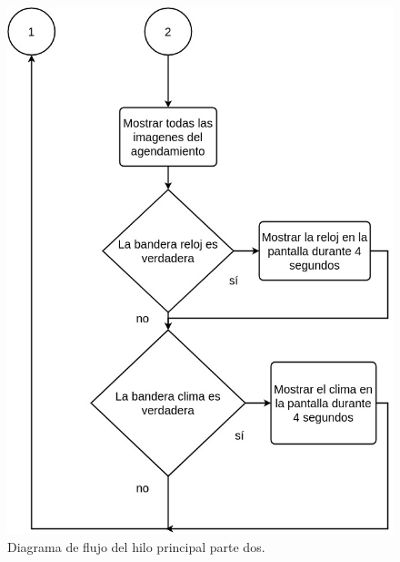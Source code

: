 \begin{figure}[htpb]
	\centering
	\includegraphics[scale=0.6]{Figures/hilo1parte2.jpg} 
	\caption{Diagrama de flujo del hilo principal parte dos.}
	\label{fig: hiloprincipal2}
\end{figure}



